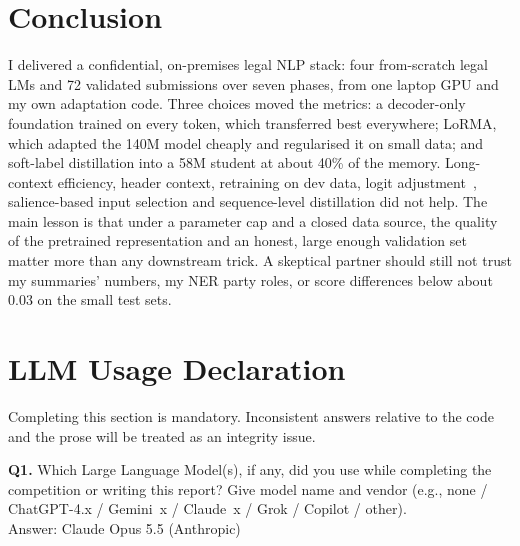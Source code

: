 \documentclass[11pt, oneside]{article}
\begin{document}
\section{Conclusion}
I delivered a confidential, on-premises legal NLP stack: four from-scratch legal LMs and 72 validated submissions
over seven phases, from one laptop GPU and my own adaptation code. Three choices moved the metrics: a decoder-only
foundation trained on every token, which transferred best everywhere; LoRMA, which adapted the 140M model cheaply and
regularised it on small data; and soft-label distillation into a 58M student at about 40\% of the memory. Long-context
efficiency, header context, retraining on dev data, logit adjustment~\cite{menon2021logit}, salience-based input
selection and sequence-level distillation did not help. The main lesson is that under a parameter cap and a closed data
source, the quality of the pretrained representation and an honest, large enough validation set matter more than any
downstream trick. A skeptical partner should still not trust my summaries' numbers, my NER party roles, or score
differences below about 0.03 on the small test sets.

\section*{LLM Usage Declaration}
Completing this section is mandatory. Inconsistent answers relative to the code and the prose will be treated as an integrity issue.
\medskip

\noindent
\textbf{Q1.} Which Large Language Model(s), if any, did you use while completing the competition or writing this report? Give model name and vendor (e.g., none / ChatGPT-4.x / Gemini~x / Claude~x / Grok / Copilot / other). \\[0.6em]
Answer: Claude Opus 5.5 (Anthropic)
\medskip
\end{document}
